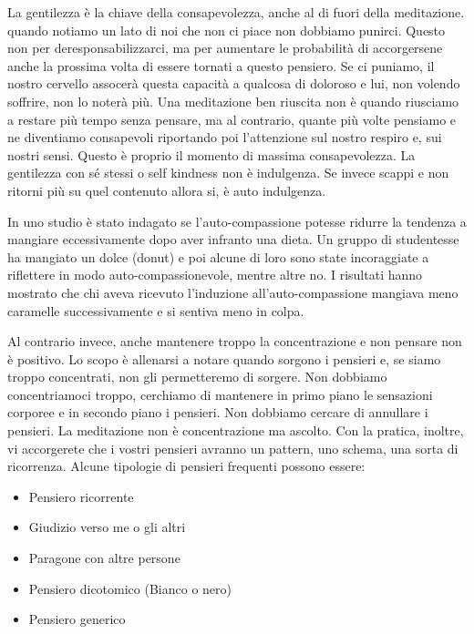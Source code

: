 \documentclass[12pt]{book} %
\begin{document}
La gentilezza è la chiave della consapevolezza, anche al di fuori della meditazione. quando notiamo un lato di
noi che non ci piace non dobbiamo punirci. Questo non per deresponsabilizzarci, ma per aumentare le probabilità di
accorgersene anche la prossima volta di essere tornati a questo pensiero. Se ci puniamo, il nostro cervello assocerà questa capacità a qualcosa di doloroso
e lui, non volendo soffrire, non lo noterà più. Una meditazione ben riuscita non è quando riusciamo a restare più tempo
senza pensare, ma al contrario, quante più volte pensiamo e ne diventiamo consapevoli riportando poi
l'attenzione sul nostro respiro e, sui nostri sensi. Questo è proprio il momento di massima
consapevolezza. 
La gentilezza con sé stessi o self kindness non è indulgenza. Se invece scappi e non ritorni più su quel contenuto allora si, è auto indulgenza.

\begin{mdframed}[linewidth=1pt]
In uno studio è stato indagato se l’auto-compassione potesse ridurre la tendenza a mangiare eccessivamente dopo aver infranto una dieta. Un gruppo di studentesse ha mangiato un dolce (donut) e poi alcune di loro sono state incoraggiate a riflettere in modo auto-compassionevole, mentre altre no. I risultati hanno mostrato che chi aveva ricevuto l’induzione all’auto-compassione mangiava meno caramelle successivamente e si sentiva meno in colpa.
\end{mdframed}

Al contrario invece, anche mantenere troppo la concentrazione e non pensare non è positivo. Lo scopo è allenarsi a notare quando sorgono i pensieri e, se siamo troppo concentrati, non gli permetteremo di sorgere. 
Non dobbiamo concentriamoci troppo, cerchiamo di mantenere in primo piano le sensazioni corporee e in secondo piano i pensieri. 
Non dobbiamo cercare di annullare i pensieri.
La meditazione non è concentrazione ma ascolto.
Con la pratica, inoltre, vi accorgerete che i vostri pensieri avranno un pattern, uno schema, una sorta di ricorrenza. 
Alcune tipologie di pensieri frequenti possono essere:
\begin{itemize}
\item Pensiero ricorrente
\item Giudizio verso me o gli altri
\item Paragone con altre persone
\item Pensiero dicotomico (Bianco o nero)
\item Pensiero generico
\end{itemize}
\end{document}
